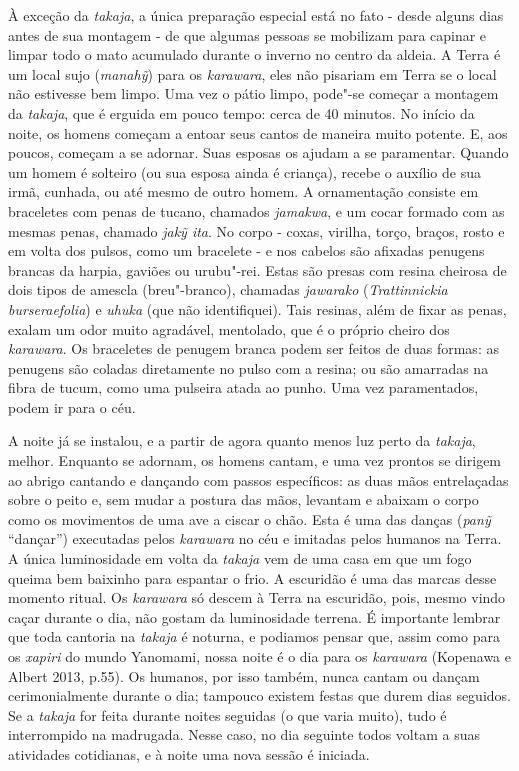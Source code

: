 À exceção da \emph{takaja}, a única preparação especial está no fato -
desde alguns dias antes de sua montagem - de que algumas pessoas se
mobilizam para capinar e limpar todo o mato acumulado durante o inverno
no centro da aldeia. A Terra é um local sujo (\emph{manahỹ}) para os
\emph{karawara}, eles não pisariam em Terra se o local não estivesse bem
limpo. Uma vez o pátio limpo, pode"-se começar a montagem da
\emph{takaja}, que é erguida em pouco tempo: cerca de 40 minutos. No
início da noite, os homens começam a entoar seus cantos de maneira muito
potente. E, aos poucos, começam a se adornar. Suas esposas os ajudam a
se paramentar. Quando um homem é solteiro (ou sua esposa ainda é
criança), recebe o auxílio de sua irmã, cunhada, ou até mesmo de outro
homem. A ornamentação consiste em braceletes com penas de tucano,
chamados \emph{jamakwa}, e um cocar formado com as mesmas penas, chamado
\emph{jakỹ ita}. No corpo - coxas, virilha, torço, braços, rosto e em
volta dos pulsos, como um bracelete - e nos cabelos são afixadas
penugens brancas da harpia, gaviões ou urubu"-rei. Estas são presas com
resina cheirosa de dois tipos de amescla (breu"-branco), chamadas
\emph{jawarako} (\emph{Trattinnickia burseraefolia}) e \emph{uhuka} (que
não identifiquei). Tais resinas, além de fixar as penas, exalam um odor
muito agradável, mentolado, que é o próprio cheiro dos \emph{karawara}.
Os braceletes de penugem branca podem ser feitos de duas formas: as
penugens são coladas diretamente no pulso com a resina; ou são amarradas
na fibra de tucum, como uma pulseira atada ao punho. Uma vez
paramentados, podem ir para o céu.

A noite já se instalou, e a partir de agora quanto menos luz perto da
\emph{takaja}, melhor. Enquanto se adornam, os homens cantam, e uma vez
prontos se dirigem ao abrigo cantando e dançando com passos específicos:
as duas mãos entrelaçadas sobre o peito e, sem mudar a postura das mãos,
levantam e abaixam o corpo como os movimentos de uma ave a ciscar o
chão. Esta é uma das danças (\emph{panỹ} ``dançar'') executadas pelos
\emph{karawara} no céu e imitadas pelos humanos na Terra. A única
luminosidade em volta da \emph{takaja} vem de uma casa em que um fogo
queima bem baixinho para espantar o frio. A escuridão é uma das marcas
desse momento ritual. Os \emph{karawara} só descem à Terra na escuridão,
pois, mesmo vindo caçar durante o dia, não gostam da luminosidade
terrena. É importante lembrar que toda cantoria na \emph{takaja} é
noturna, e podiamos pensar que, assim como para os \emph{xapiri} do
mundo Yanomami, nossa noite é o dia para os \emph{karawara} (Kopenawa e
Albert 2013, p.55). Os humanos, por isso também, nunca cantam ou dançam
cerimonialmente durante o dia; tampouco existem festas que durem dias
seguidos. Se a \emph{takaja} for feita durante noites seguidas (o que
varia muito), tudo é interrompido na madrugada. Nesse caso, no dia
seguinte todos voltam a suas atividades cotidianas, e à noite uma nova
sessão é iniciada.

